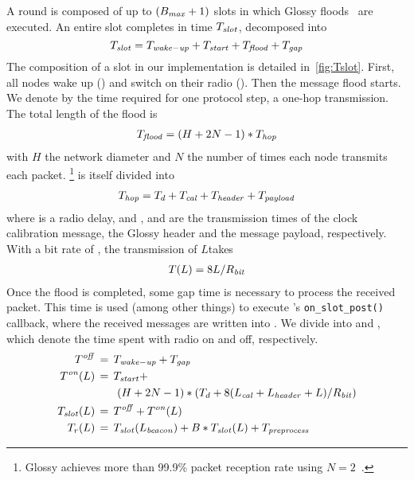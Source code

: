 
A round \Tround is composed of up to $(B_{\mathit{max}}+1)$ slots in which Glossy floods~\cite{ferrari2011Glossy} are executed.
An entire slot completes in time $T_{\mathit{slot}}$, decomposed into
\begin{equation}
  T_{\mathit{slot}} = T_{\mathit{wake-up}} + T_{\mathit{start}} + T_{\mathit{flood}} + T_{\mathit{gap}}
\end{equation}
The composition of a slot in our implementation is detailed in~\cref{fig:Tslot}.
First, all nodes wake up (\Twakeup) and switch on their radio (\Tstart).
Then the message flood starts. We denote by \Thop the time required for one protocol step, \ie a one-hop transmission. The total length of the flood is
%
\begin{align}
T_{\mathit{flood}} = (H+2N-1)*T_{\mathit{hop}}
\end{align}
with $H$ the network diameter and $N$ the number of times each node transmits each packet.%
%
\footnote{Glossy achieves more than 99.9\% packet reception rate using $N =2$~\cite{ferrari2011Glossy}.}
%
\Thop is itself divided into
%
\begin{align}
T_{\mathit{hop}} = T_{d} + T_{\mathit{cal}} + T_{\mathit{header}} + T_{\mathit{payload}}
\end{align}
where \Td is a radio delay, and \Tcal, \Theader and \Tpayload are the transmission times of the clock calibration message, the Glossy header and the message payload, respectively.
With a bit rate of \Rbit, the transmission of $L$\bytes takes
%
\begin{align}
T(L) = 8L/R_{\mathit{bit}}
\end{align}
Once the flood is completed, some gap time \Tgap is necessary to process the received packet.
This time is used (among other things) to execute \baloo's \texttt{on\_slot\_post()} callback, where the received messages are written into \bolt.
We divide \Tslot into \Ton and \Toff, which denote the time spent with radio on and off, respectively.
%
\begin{align}
T^{\mathit{off}} &\,=\,
	T_{\mathit{wake-up}} + T_{\mathit{gap}} \\
\nonumber
T^{\mathit{on}}(L) &\,=\,
	T_{\mathit{start}} + \\
\label{eq:Ton}
  & \qquad (H+2N-1) * \left( T_{d} + 8(L_{\mathit{cal}} + L_{\mathit{header}} + L)/R_{\mathit{bit}} \right) \\
T_{\mathit{slot}}(L) &\,=\,
  T^{\mathit{off}} + T^{\mathit{on}}(L) \\
T_{r}(L)
	&\,=\,
	T_{\mathit{slot}}(L_{\mathit{beacon}}) + B*T_{\mathit{slot}}(L) + T_{\mathit{preprocess}}
\end{align}

